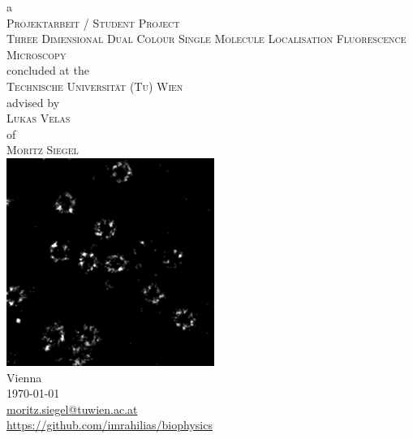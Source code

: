 \documentclass[11pt, a4paper, oneside, twocolumn]{report}
\begin{document}
\begin{titlepage}
  \onecolumn
  \centering
  \large
  a\\
  \vspace{.5cm}
  {\Large \textsc{Projektarbeit / Student Project}}\\
  \vspace{1cm}
  {\Huge \textsc{Three Dimensional Dual Colour Single Molecule Localisation Fluorescence Microscopy}}\\
  \vspace{1cm}
  concluded at the\\
  \vspace{.5cm}
  {\Large \textsc{Technische Universit\"at (Tu) Wien}}\\
  \vspace{.5cm}
  advised by\\
  \vspace{.5cm}
  {\Large \textsc{Lukas Velas}}\\
  \vspace{.5cm}
  of\\
  \vspace{.5cm}
  {\Large \textsc{Moritz Siegel}}\\
  \vfill
  \includegraphics[scale=.5]{npc/npc256.png}\\
  \vfill
  Vienna\\
  \today\\
  \vspace{.5cm}
  \small{\href{mailto:moritz.siegel@tuwien.ac.at}{moritz.siegel@tuwien.ac.at}}\\
  \small{\url{https://github.com/imrahilias/biophysics}}\\
\end{titlepage}
\end{document}
